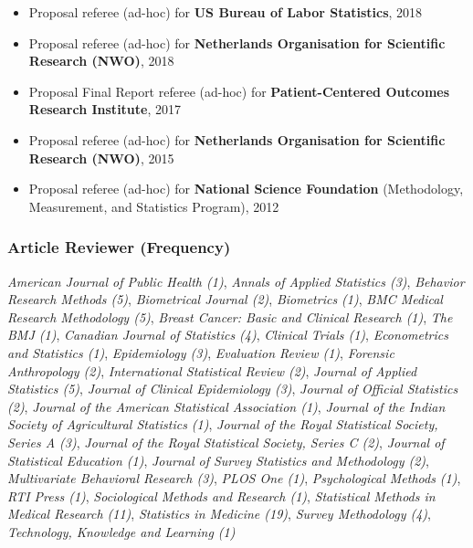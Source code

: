 \documentclass[
  english,
  letterpaper,
  DIV=11,
  numbers=noendperiod]{scrartcl}
\providecommand{\tightlist}{%
  \setlength{\itemsep}{0pt}\setlength{\parskip}{0pt}}
\begin{document}
\begin{itemize}
\tightlist
\item
  Proposal referee (ad-hoc) for \textbf{US Bureau of Labor Statistics},
  2018
\item
  Proposal referee (ad-hoc) for \textbf{Netherlands Organisation for
  Scientific Research (NWO)}, 2018
\item
  Proposal Final Report referee (ad-hoc) for \textbf{Patient-Centered
  Outcomes Research Institute}, 2017
\item
  Proposal referee (ad-hoc) for \textbf{Netherlands Organisation for
  Scientific Research (NWO)}, 2015
\item
  Proposal referee (ad-hoc) for \textbf{National Science Foundation}
  (Methodology, Measurement, and Statistics Program), 2012
\end{itemize}

\subsubsection{Article Reviewer
(Frequency)}\label{article-reviewer-frequency}

\emph{American Journal of Public Health (1)}, \emph{Annals of Applied
Statistics (3)}, \emph{Behavior Research Methods (5)}, \emph{Biometrical
Journal (2)}, \emph{Biometrics (1)}, \emph{BMC Medical Research
Methodology (5)}, \emph{Breast Cancer: Basic and Clinical Research (1)},
\emph{The BMJ (1)}, \emph{Canadian Journal of Statistics (4)},
\emph{Clinical Trials (1)}, \emph{Econometrics and Statistics (1)},
\emph{Epidemiology (3)}, \emph{Evaluation Review (1)}, \emph{Forensic
Anthropology (2)}, \emph{International Statistical Review (2)},
\emph{Journal of Applied Statistics (5)}, \emph{Journal of Clinical
Epidemiology (3)}, \emph{Journal of Official Statistics (2)},
\emph{Journal of the American Statistical Association (1)},
\emph{Journal of the Indian Society of Agricultural Statistics (1)},
\emph{Journal of the Royal Statistical Society, Series A (3)},
\emph{Journal of the Royal Statistical Society, Series C (2)},
\emph{Journal of Statistical Education (1)}, \emph{Journal of Survey
Statistics and Methodology (2)}, \emph{Multivariate Behavioral Research
(3)}, \emph{PLOS One (1)}, \emph{Psychological Methods (1)}, \emph{RTI
Press (1)}, \emph{Sociological Methods and Research (1)},
\emph{Statistical Methods in Medical Research (11)}, \emph{Statistics in
Medicine (19)}, \emph{Survey Methodology (4)}, \emph{Technology,
Knowledge and Learning (1)}
\end{document}
